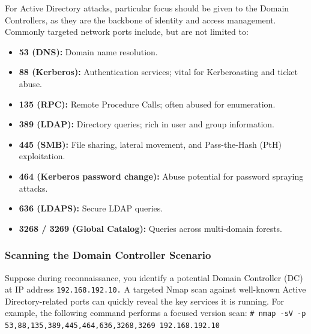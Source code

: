 For Active Directory attacks, particular focus should be given to the Domain Controllers, as they are the backbone of identity and access management. Commonly targeted network ports include, but are not limited to:
\begin{itemize}
    \item \textbf{53 (DNS):} Domain name resolution.
    \item \textbf{88 (Kerberos):} Authentication services; vital for Kerberoasting and ticket abuse.
    \item \textbf{135 (RPC):} Remote Procedure Calls; often abused for enumeration.
    \item \textbf{389 (LDAP):} Directory queries; rich in user and group information.
    \item \textbf{445 (SMB):} File sharing, lateral movement, and Pass-the-Hash (PtH) exploitation.
    \item \textbf{464 (Kerberos password change):} Abuse potential for password spraying attacks.
    \item \textbf{636 (LDAPS):} Secure LDAP queries.
    \item \textbf{3268 / 3269 (Global Catalog):} Queries across multi-domain forests.
\end{itemize}

\subsubsection{Scanning the Domain Controller Scenario}
Suppose during reconnaissance, you identify a potential Domain Controller (DC) at IP address \texttt{192.168.192.10.} A targeted Nmap scan against well-known Active Directory-related ports can quickly reveal the key services it is running. For example, the following command performs a focused version scan:
\texttt{\# nmap -sV -p 53,88,135,389,445,464,636,3268,3269 192.168.192.10}

